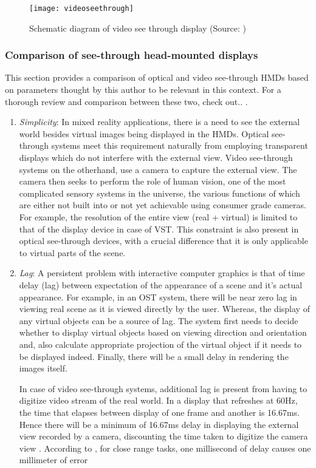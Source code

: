 \begin{figure}
	\centering
	\texttt{[image: videoseethrough]}
	\caption{Schematic diagram of video see through display (Source: \cite{azuma1997survey})}
	\label{fig:videoseethrough}
\end{figure}

\subsubsection{Comparison of see-through head-mounted displays}
This section provides a comparison of optical and video see-through HMDs based on parameters thought by this author to be relevant in this context. For a thorough review and comparison between these two, check out.. .

\begin{enumerate}
\item \textit{Simplicity}: In mixed reality applications, there is a need to see the external world besides virtual images being displayed in the HMDs. Optical see-through systems meet this requirement naturally from employing transparent displays which do not interfere with the external view. Video see-through systems on the otherhand, use a camera to capture the external view. The camera then seeks to perform the role of human vision, one of the most complicated sensory systems in the universe, the various functions of which are either not built into or not yet achievable using consumer grade cameras. For example, the resolution of the entire view (real + virtual) is limited to that of the display device in case of VST. This constraint is also present in optical see-through devices, with a crucial difference that it is only applicable to virtual parts of the scene. 

\item \textit{Lag}: A persistent problem with interactive computer graphics is that of time delay (lag) between expectation of the appearance of a scene and it's actual appearance. For example, in an OST system, there will be near zero lag in viewing real scene as it is viewed directly by the user. Whereas, the display of any virtual objects can be a source of lag. The system first needs to decide whether to display virtual objects based on viewing direction and orientation and, also calculate appropriate projection of the virtual object if it needs to be displayed indeed. Finally, there will be a small delay in rendering the images itself. 

In case of video see-through systems, additional lag is present from having to digitize video stream of the real world. In a display that refreshes at 60Hz, the time that elapses between display of one frame and another is 16.67ms. Hence there will be a minimum of 16.67ms delay in displaying the external view recorded by a camera, discounting the time taken to digitize the camera view . According to \parencite{ellis1997factors}, for close range tasks, one millisecond of delay causes one millimeter of error


\end{enumerate}
